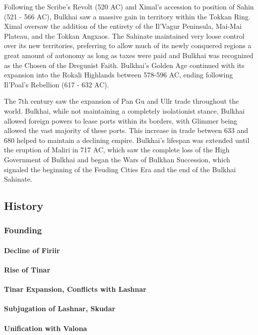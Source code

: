 	Following the Scribe's Revolt (520 AC) and Ximal's accession to position of Sahin (521 - 566 AC), Bulkhai saw a massive gain in territory within the Tokkan Ring. Ximal oversaw the addition of the entirety of the Il'Vagur Peninsula, Mai-Mai Plateau, and the Tokkan Angxaos. The Sahinate maintained very loose control over its new territories, preferring to allow much of its newly conquered regions a great amount of autonomy as long as taxes were paid and Bulkhai was recognized as the Chosen of the Dregunist Faith. Bulkhai's Golden Age continued with its expansion into the Rokali Highlands between 578-596 AC, ending following Il'Poal's Rebellion (617 - 632 AC). 
	
	The 7th century saw the expansion of Pan Gu and Ullr trade throughout the world. Bulkhai, while not maintaining a completely isolationist stance, Bulkhai allowed foreign powers to lease ports within its borders, with Glimmer being allowed the vast majority of these ports. This increase in trade between 633 and 680 helped to maintain a declining empire. Bulkhai's lifespan was extended until the eruption of Maliri in 717 AC, which saw the complete loss of the High Government of Bulkhai and began the Wars of Bulkhan Succession, which signaled the beginning of the Feuding Cities Era and the end of the Bulkhai Sahinate.
	
\subsection{History}	
	\subsubsection{Founding}
		\paragraph{Decline of Firiir}
		\paragraph{Rise of Tinar}
		\paragraph{Tinar Expansion, Conflicts with Lashnar}
		\paragraph{Subjugation of Lashnar, Skudar}
		\paragraph{Unification with Valona}
